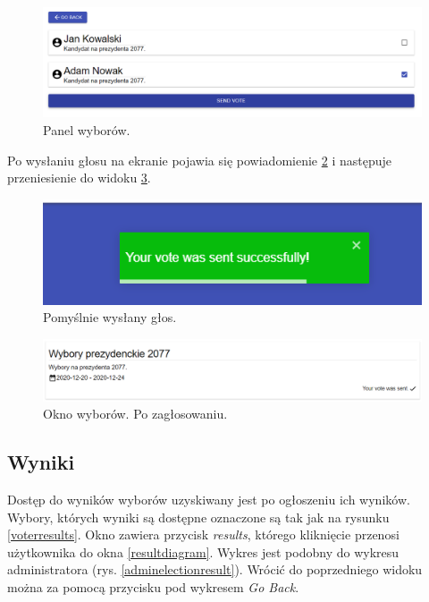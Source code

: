 \documentclass[a4paper,12pt]{book}
\begin{document}
\begin{figure}[H]
	\centering
	\includegraphics[width=\textwidth]{images/votescreen.png}
	\caption{Panel wyborów.}\label{votescreen}
\end {figure}

Po wysłaniu głosu na ekranie pojawia się powiadomienie \ref{votesuccess} i następuje przeniesienie do widoku \ref{votesent}.

\begin{figure}[H]
	\centering
	\includegraphics{images/votesuccess.png}
	\caption{Pomyślnie wysłany głos.}\label{votesuccess}
\end {figure}

\begin{figure}[H]
	\centering
	\includegraphics[width=\textwidth]{images/votesent.png}
	\caption{Okno wyborów. Po zagłosowaniu.}\label{votesent}
\end {figure}

\subsection{Wyniki}

Dostęp do wyników wyborów uzyskiwany jest po ogłoszeniu ich wyników. Wybory, których wyniki są dostępne oznaczone są tak jak na rysunku \ref{voterresults}. Okno zawiera przycisk \textit{results}, którego kliknięcie przenosi użytkownika do okna \ref{resultdiagram}. Wykres jest podobny do wykresu administratora (rys. \ref{adminelectionresult}). Wrócić do poprzedniego widoku można za pomocą przycisku pod wykresem \textit{Go Back}.
\end{document}
